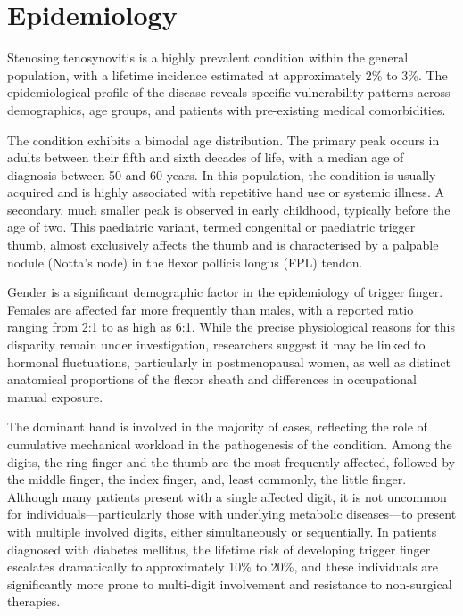 \section*{Epidemiology}
Stenosing tenosynovitis is a highly prevalent condition within the general population, with a lifetime incidence estimated at approximately 2\% to 3\%. The epidemiological profile of the disease reveals specific vulnerability patterns across demographics, age groups, and patients with pre-existing medical comorbidities.

The condition exhibits a bimodal age distribution. The primary peak occurs in adults between their fifth and sixth decades of life, with a median age of diagnosis between 50 and 60 years. In this population, the condition is usually acquired and is highly associated with repetitive hand use or systemic illness. A secondary, much smaller peak is observed in early childhood, typically before the age of two. This paediatric variant, termed congenital or paediatric trigger thumb, almost exclusively affects the thumb and is characterised by a palpable nodule (Notta's node) in the flexor pollicis longus (FPL) tendon.

Gender is a significant demographic factor in the epidemiology of trigger finger. Females are affected far more frequently than males, with a reported ratio ranging from 2:1 to as high as 6:1. While the precise physiological reasons for this disparity remain under investigation, researchers suggest it may be linked to hormonal fluctuations, particularly in postmenopausal women, as well as distinct anatomical proportions of the flexor sheath and differences in occupational manual exposure.

The dominant hand is involved in the majority of cases, reflecting the role of cumulative mechanical workload in the pathogenesis of the condition. Among the digits, the ring finger and the thumb are the most frequently affected, followed by the middle finger, the index finger, and, least commonly, the little finger. Although many patients present with a single affected digit, it is not uncommon for individuals---particularly those with underlying metabolic diseases---to present with multiple involved digits, either simultaneously or sequentially. In patients diagnosed with diabetes mellitus, the lifetime risk of developing trigger finger escalates dramatically to approximately 10\% to 20\%, and these individuals are significantly more prone to multi-digit involvement and resistance to non-surgical therapies.

